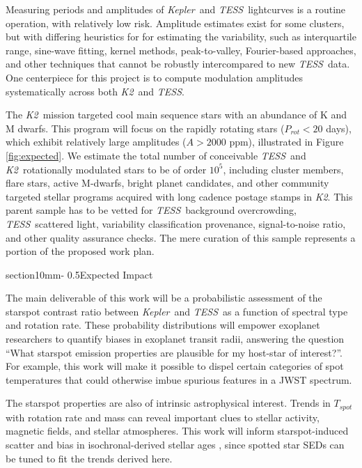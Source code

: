 \documentclass[letterpaper,12pt]{article}
\makeatletter
\renewcommand{\section}{\@startsection%
{section}{1}{0mm}{-\baselineskip}%
{0.5\baselineskip}{\normalfont\Large\bfseries}}%
\newcommand{\tess}{{\it TESS}}
\newcommand{\kepler}{{\it Kepler}}
\newcommand{\ktwo}{{\it K2}}
\makeatother
\begin{document}
Measuring periods and amplitudes of \kepler\ and \tess\ lightcurves is a routine operation, with relatively low risk.  Amplitude estimates exist for some clusters, but with differing heuristics for for estimating the variability, such as interquartile range, sine-wave fitting, kernel methods, peak-to-valley, Fourier-based approaches, and other techniques that cannot be robustly intercompared to new \tess\ data.  One centerpiece for this project is to compute modulation amplitudes systematically across both \ktwo\ and \tess.  

The \ktwo\ mission targeted cool main sequence stars with an abundance of K and M dwarfs.  This program will focus on the rapidly rotating stars ($P_{rot}<20$ days), which exhibit relatively large amplitudes ($A>2000$ ppm), illustrated in Figure \ref{fig:expected}.  We estimate the total number of conceivable \tess\ and \ktwo\ rotationally modulated stars to be of order $10^5$, including cluster members, flare stars, active M-dwarfs, bright planet candidates, and other community targeted stellar programs acquired with long cadence postage stamps in \ktwo.  This parent sample has to be vetted for \tess\ background overcrowding, \tess\ scattered light, variability classification provenance, signal-to-noise ratio, and other quality assurance checks. The mere curation of this sample represents a portion of the proposed work plan.

\section{Expected Impact}

The main deliverable of this work will be a probabilistic assessment of the starspot contrast ratio between \kepler\ and \tess\ as a function of spectral type and rotation rate. These probability distributions will empower exoplanet researchers to quantify biases in exoplanet transit radii, answering the question ``What starspot emission properties are plausible for my host-star of interest?''.  For example, this work will make it possible to dispel certain categories of spot temperatures that could otherwise imbue spurious features in a JWST spectrum.

The starspot properties are also of intrinsic astrophysical interest.  Trends in $T_{spot}$ with rotation rate and mass can reveal important clues to stellar activity, magnetic fields, and stellar atmospheres.  This work will inform starspot-induced scatter and bias in isochronal-derived stellar ages \cite{2015ApJ...807..174S, 2017ApJ...836..200G}, since spotted star SEDs can be tuned to fit the trends derived here.
\end{document}
